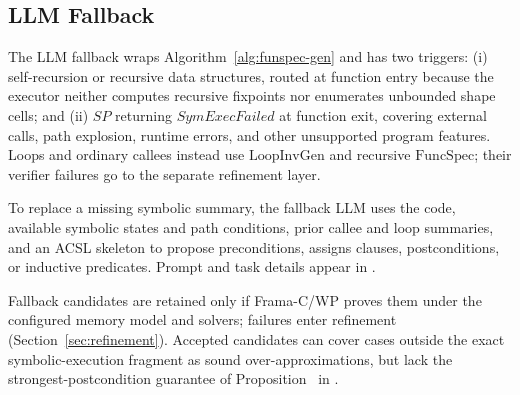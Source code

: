\subsection{LLM Fallback}
\label{sec:llm-fallback}

The LLM fallback wraps Algorithm~\ref{alg:funspec-gen} and has two triggers: (i) self-recursion or recursive data structures, routed at function entry because the executor neither computes recursive fixpoints nor enumerates unbounded shape cells; and (ii) $\textit{SP}$ returning $\textit{SymExecFailed}$ at function exit, covering external calls, path explosion, runtime errors, and other unsupported program features. Loops and ordinary callees instead use $\mathrm{LoopInvGen}$ and recursive $\mathrm{FuncSpec}$; their verifier failures go to the separate refinement layer.

{To replace a missing symbolic summary, the fallback LLM uses the code, available symbolic states and path conditions, prior callee and loop summaries, and an ACSL skeleton to propose preconditions, assigns clauses, postconditions, or inductive predicates. Prompt and task details appear in .}

Fallback candidates are retained only if Frama-C/WP proves them under the configured memory model and solvers; failures enter refinement (Section~\ref{sec:refinement}). Accepted candidates can cover cases outside the exact symbolic-execution fragment as sound over-approximations, but lack the strongest-postcondition guarantee of Proposition~ in .

